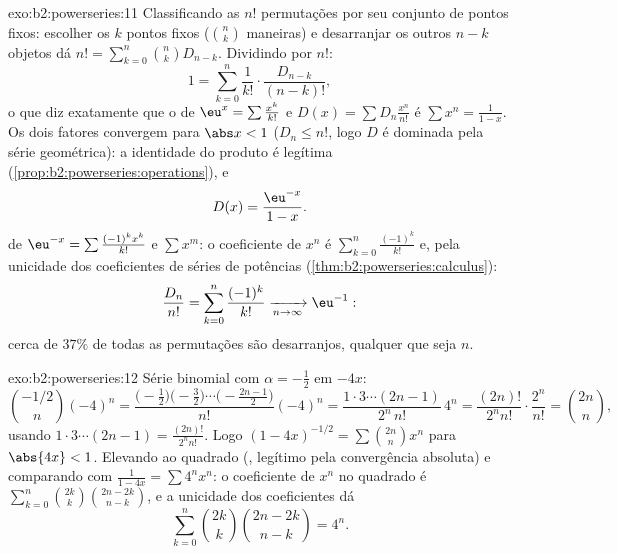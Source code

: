 \begin{solution}{exo:b2:powerseries:11}
Classificando as $n!$ permutações por seu conjunto de pontos fixos: escolher
os $k$ pontos fixos ($\binom nk$ maneiras) e desarranjar os outros
$n - k$ objetos dá $n! = \sum_{k=0}^n\binom nk D_{n-k}$.
Dividindo por $n!$:
\[
1 = \sum_{k=0}^{n}\frac{1}{k!}\cdot\frac{D_{n-k}}{(n-k)!} ,
\]
o que diz exatamente que o  de $\eu^x =
\sum\frac{x^k}{k!}$ e $D(x) = \sum D_n\frac{x^n}{n!}$ é
$\sum x^n = \frac{1}{1-x}$. Os dois fatores convergem 
para $\abs x < 1$ ($D_n \leq n!$, logo $D$ é dominada pela
série geométrica): a identidade do produto é legítima
(\cref{prop:b2:powerseries:operations}), e
\[
D(x) = \frac{\eu^{-x}}{1-x} .
\]
 de $\eu^{-x} = \sum\frac{(-1)^kx^k}{k!}$ e
$\sum x^m$: o coeficiente de $x^n$ é
$\sum_{k=0}^{n}\frac{(-1)^k}{k!}$ e, pela unicidade dos coeficientes de
séries de potências (\cref{thm:b2:powerseries:calculus}):
\[
\frac{D_n}{n!} = \sum_{k=0}^{n}\frac{(-1)^k}{k!}
\xrightarrow[n\to\infty]{} \eu^{-1} :
\]
cerca de $37\%$ de todas as permutações são desarranjos, qualquer que seja
$n$.
\end{solution}

\begin{solution}{exo:b2:powerseries:12}
Série binomial com $\alpha = -\frac12$ em $-4x$:
\[
\binom{-1/2}{n}(-4)^n
= \frac{\bigl(-\frac12\bigr)\bigl(-\frac32\bigr)\cdots
\bigl(-\frac{2n-1}2\bigr)}{n!}(-4)^n
= \frac{1\cdot3\cdots(2n-1)}{2^n\,n!}\,4^n
= \frac{(2n)!}{2^n n!}\cdot\frac{2^n}{n!}
= \binom{2n}{n},
\]
usando $1\cdot3\cdots(2n-1) = \frac{(2n)!}{2^nn!}$. Logo
$(1-4x)^{-1/2} = \sum\binom{2n}nx^n$ para $\abs{4x} < 1$.
Elevando ao quadrado (, legítimo pela convergência absoluta)
e comparando com $\frac{1}{1-4x} = \sum 4^nx^n$: o
coeficiente de $x^n$ no quadrado é
$\sum_{k=0}^n\binom{2k}k\binom{2n-2k}{n-k}$, e a unicidade dos
coeficientes dá
\[
\sum_{k=0}^{n}\binom{2k}{k}\binom{2n-2k}{n-k} = 4^n .
\]
\end{solution}

